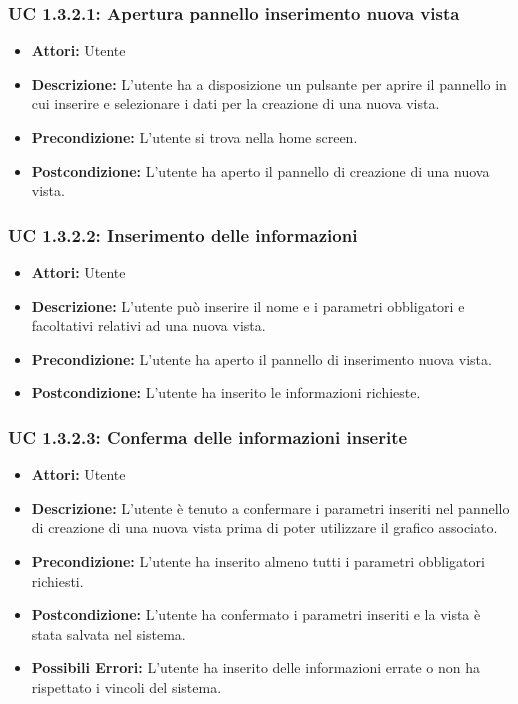 \subsubsection{UC 1.3.2.1: Apertura pannello inserimento nuova vista}

\begin{itemize}
\item \textbf{Attori:} Utente
\item \textbf{Descrizione:} L'utente ha a disposizione un pulsante per aprire il pannello in cui inserire e selezionare i dati per la creazione di una nuova vista.
\item \textbf{Precondizione:} L'utente si trova nella home screen.
\item \textbf{Postcondizione:} L'utente ha aperto il pannello di creazione di una nuova vista.
\end{itemize}

\subsubsection{UC 1.3.2.2: Inserimento delle informazioni}

\begin{itemize}
\item \textbf{Attori:} Utente
\item \textbf{Descrizione:} L'utente può inserire il nome e i parametri obbligatori e facoltativi relativi ad una nuova vista.
\item \textbf{Precondizione:} L'utente ha aperto il pannello di inserimento nuova vista.
\item \textbf{Postcondizione:} L'utente ha inserito le informazioni richieste.
\end{itemize}

\subsubsection{UC 1.3.2.3: Conferma delle informazioni inserite}

\begin{itemize}
\item \textbf{Attori:} Utente
\item \textbf{Descrizione:} L'utente è tenuto a confermare i parametri inseriti nel pannello di creazione di una nuova vista prima di poter utilizzare il grafico associato.
\item \textbf{Precondizione:} L'utente ha inserito almeno tutti i parametri obbligatori richiesti.
\item \textbf{Postcondizione:} L'utente ha confermato i parametri inseriti e la vista è stata salvata nel sistema.
\item \textbf{Possibili Errori:} L'utente ha inserito delle informazioni errate o non ha rispettato i vincoli del sistema. 
\end{itemize}

